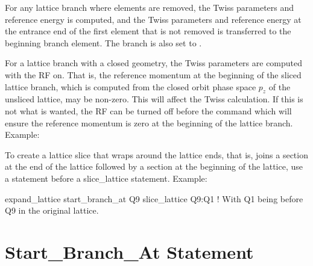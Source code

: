 {{{{{For any lattice branch where elements are removed, the Twiss parameters and reference energy is
computed, and the Twiss parameters and reference energy at the entrance end of the first element
that is not removed is transferred to the beginning branch element. The branch  is also
set to .

For a lattice branch with a closed geometry, the Twiss parameters are computed with the RF on. That
is, the reference momentum at the beginning of the sliced lattice branch, which is computed from the
closed orbit phase space $p_z$ of the unsliced lattice, may be non-zero. This will affect the Twiss
calculation. If this is not what is wanted, the RF can be turned off before the 
command which will ensure the reference momentum is zero at the beginning of the lattice
branch. Example:

To create a lattice slice that wraps around the lattice ends, that is, joins a section at the end of
the lattice followed by a section at the beginning of the lattice, use a 
statement before a slice_lattice statement. Example:
\begin{example}
  expand_lattice
  start_branch_at Q9
  slice_lattice Q9:Q1   ! With Q1 being before Q9 in the original lattice.
\end{example}

\section{Start_Branch_At Statement}
\label{s:start.branch}

}}}}}
